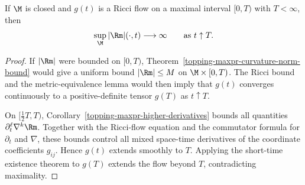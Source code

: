 \begin{theorem}
\label{topping-ricci-flow-curvature-blows-up}

If $\M$ is closed and $g(t)$ is a Ricci flow on a maximal interval
$[0,T)$ with $T<\infty$, then
\[
\sup_{\M}|\Rm|(\cdot,t)\longrightarrow\infty
\qquad\text{as }t\uparrow T.
\]
\end{theorem}

\begin{proof}
\sketch If $|\Rm|$ were bounded on $[0,T)$, Theorem~\ref{topping-maxpr-curvature-norm-bound} would give a
uniform bound $|\Rm|\leq M$ on $\M\times[0,T)$. The Ricci bound and the
metric-equivalence lemma would then imply that $g(t)$ converges continuously
to a positive-definite tensor $g(T)$ as $t\uparrow T$.

On $[\frac12T,T)$, Corollary~\ref{topping-maxpr-higher-derivatives} bounds all quantities
$\partial_t^\ell\nabla^k\Rm$. Together with the Ricci-flow equation and the
commutator formula for $\partial_t$ and $\nabla$, these bounds control all
mixed space-time derivatives of the coordinate coefficients $g_{ij}$. Hence
$g(t)$ extends smoothly to $T$. Applying the short-time existence theorem to
$g(T)$ extends the flow beyond $T$, contradicting maximality.
\end{proof}
